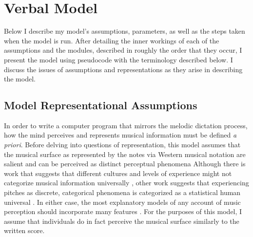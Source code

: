 \documentclass[12pt,]{book}
\begin{document}
\hypertarget{verbal-model}{%
\section{Verbal Model}\label{verbal-model}}

Below I describe my model's assumptions, parameters, as well as the steps taken when the model is run.
After detailing the inner workings of each of the assumptions and the modules, described in roughly the order that they occur, I present the model using pseudocode with the terminology described below.
I discuss the issues of assumptions and representations as they arise in describing the model.

\hypertarget{model-representational-assumptions}{%
\subsection{Model Representational Assumptions}\label{model-representational-assumptions}}

In order to write a computer program that mirrors the melodic dictation process, how the mind perceives and represents musical information must be defined \emph{a priori}.
Before delving into questions of representation, this model assumes that the musical surface as represented by the notes via Western musical notation are salient and can be perceived as distinct perceptual phenomena
Although there is work that suggests that different cultures and levels of experience might not categorize musical information universally \citep{mcdermottIndifferenceDissonanceNative2016}, other work suggests that experiencing pitches as discrete, categorical phenomena is categorized as a statistical human universal \citep{savageStatisticalUniversalsReveal2015}.
In either case, the most explanatory models of any account of music perception should incorporate many features \citep{harrisonInstantaneousConsonancePerception}.
For the purposes of this model, I assume that individuals do in fact perceive the musical surface similarly to the written score.
\end{document}
